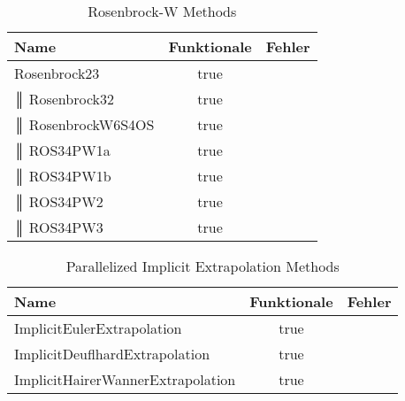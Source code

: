 \begin{table}[]
    \centering

    \begin{tabular}{p{5cm}|c|p{5cm}}
        Name & Funktionale & Fehler \\
        \hline\hline
        Rosenbrock23     & true & \\                                                                                                                          ║
        Rosenbrock32     & true & \\                                                                                                                          ║
        RosenbrockW6S4OS & true & \\                                                                                                                      ║
        ROS34PW1a        & true & \\                                                                                                                             ║
        ROS34PW1b        & true & \\                                                                                                                             ║
        ROS34PW2         & true & \\                                                                                                                              ║
        ROS34PW3         & true & \\            
    \end{tabular}
    \caption{Rosenbrock-W Methods}
    \label{tab:my_label}
\end{table}

\begin{table}[]
    \centering

    \begin{tabular}{p{10cm}|c|p{1cm}}
        Name & Funktionale & Fehler \\
        \hline\hline
            ImplicitEulerExtrapolation & true & \\ 
            ImplicitDeuflhardExtrapolation & true & \\ 
            ImplicitHairerWannerExtrapolation & true & \\ 
    \end{tabular}
    \caption{Parallelized Implicit Extrapolation Methods}
    \label{tab:my_label}
\end{table}

